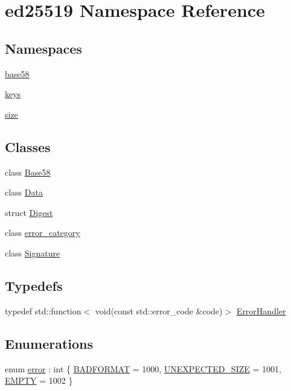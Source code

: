 \hypertarget{namespaceed25519}{}\section{ed25519 Namespace Reference}
\label{namespaceed25519}
\subsection*{Namespaces}
\begin{DoxyCompactItemize}
\item 
 \mbox{\hyperlink{namespaceed25519_1_1base58}{base58}}
\item 
 \mbox{\hyperlink{namespaceed25519_1_1keys}{keys}}
\item 
 \mbox{\hyperlink{namespaceed25519_1_1size}{size}}
\end{DoxyCompactItemize}
\subsection*{Classes}
\begin{DoxyCompactItemize}
\item 
class \mbox{\hyperlink{classed25519_1_1_base58}{Base58}}
\item 
class \mbox{\hyperlink{classed25519_1_1_data}{Data}}
\item 
struct \mbox{\hyperlink{structed25519_1_1_digest}{Digest}}
\item 
class \mbox{\hyperlink{classed25519_1_1error__category}{error\+\_\+category}}
\item 
class \mbox{\hyperlink{classed25519_1_1_signature}{Signature}}
\end{DoxyCompactItemize}
\subsection*{Typedefs}
\begin{DoxyCompactItemize}
\item 
typedef std\+::function$<$ void(const std\+::error\+\_\+code \&code)$>$ \mbox{\hyperlink{namespaceed25519_a6ba572942b3c18591fc869d52a6b16e6}{Error\+Handler}}
\end{DoxyCompactItemize}
\subsection*{Enumerations}
\begin{DoxyCompactItemize}
\item 
enum \mbox{\hyperlink{namespaceed25519_ac93d0b5156eaca22197055e902920bc4}{error}} \+: int \{ \mbox{\hyperlink{namespaceed25519_ac93d0b5156eaca22197055e902920bc4a28729b5efcbf8605d4412dbb86c3963b}{B\+A\+D\+F\+O\+R\+M\+AT}} = 1000, 
\mbox{\hyperlink{namespaceed25519_ac93d0b5156eaca22197055e902920bc4a4a6895889f9590d64f64599b968a48b0}{U\+N\+E\+X\+P\+E\+C\+T\+E\+D\+\_\+\+S\+I\+ZE}} = 1001, 
\mbox{\hyperlink{namespaceed25519_ac93d0b5156eaca22197055e902920bc4ad16a8ea865652b7e7222111ab6f7ea36}{E\+M\+P\+TY}} = 1002
 \}
\end{DoxyCompactItemize}
